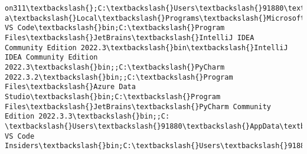 \documentclass[11pt]{article}
\makeatletter
\newcommand{\boxspacing}{\kern\kvtcb@left@rule\kern\kvtcb@boxsep}
\newcommand{\prompt}[4]{
        {\ttfamily\llap{{\color{#2}[#3]:\hspace{3pt}#4}}\vspace{-\baselineskip}}
    }
\makeatother
\begin{document}
\begin{Verbatim}[commandchars=\\\{\}]
on311\textbackslash{};C:\textbackslash{}Users\textbackslash{}91880\textbackslash{}AppData\textbackslash{}Local\textbackslash{}Microsoft\textbackslash{}WindowsApps;;C:\textbackslash{}Users\textbackslash{}91880\textbackslash{}AppDat
a\textbackslash{}Local\textbackslash{}Programs\textbackslash{}Microsoft VS Code\textbackslash{}bin;C:\textbackslash{}Program Files\textbackslash{}JetBrains\textbackslash{}IntelliJ IDEA
Community Edition 2022.3\textbackslash{}bin\textbackslash{}IntelliJ IDEA Community Edition
2022.3\textbackslash{}bin;;C:\textbackslash{}PyCharm 2022.3.2\textbackslash{}bin;;C:\textbackslash{}Program Files\textbackslash{}Azure Data
Studio\textbackslash{}bin;C:\textbackslash{}Program Files\textbackslash{}JetBrains\textbackslash{}PyCharm Community Edition 2022.3.3\textbackslash{}bin;;C:
\textbackslash{}Users\textbackslash{}91880\textbackslash{}AppData\textbackslash{}Roaming\textbackslash{}npm;C:\textbackslash{}Users\textbackslash{}91880\textbackslash{}AppData\textbackslash{}Local\textbackslash{}Programs\textbackslash{}Microsoft
VS Code Insiders\textbackslash{}bin;C:\textbackslash{}Users\textbackslash{}91880\textbackslash{}.dotnet\textbackslash{}tools
    \end{Verbatim}

    \begin{tcolorbox}[breakable, size=fbox, boxrule=1pt, pad at break*=1mm,colback=cellbackground, colframe=cellborder]
\prompt{In}{incolor}{ }{\boxspacing}
\begin{Verbatim}[commandchars=\\\{\}]

\end{Verbatim}
\end{tcolorbox}


    
    
    
\end{document}
